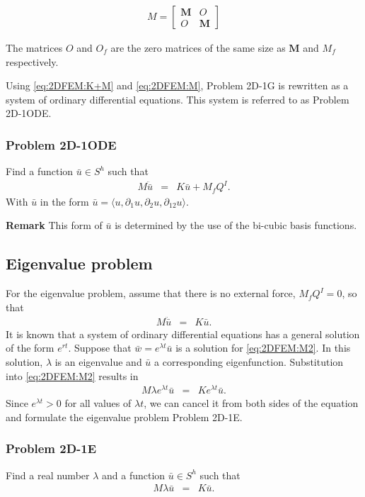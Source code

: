 \documentclass[../../main.tex]{subfiles}
\begin{document}
\begin{eqnarray}
	M = 
	\begin{bmatrix}
		\mathbf{M} & O \\
		O & \mathbf{M}
	\end{bmatrix}\label{eq:2DFEM:M}
\end{eqnarray}

The matrices ${O}$ and ${O_f}$ are the zero matrices of the same size as $\mathbf{M}$ and ${M_f}$ respectively.

Using \eqref{eq:2DFEM:K+M} and \eqref{eq:2DFEM:M}, Problem 2D-1G is rewritten as a system of ordinary differential equations. This system is referred to as Problem 2D-1ODE.

\subsubsection{Problem 2D-1ODE}
Find a function $\bar{u} \in S^h$ such that
\begin{eqnarray}
	M\ddot{\bar{u}} & = & K\bar{u} + M_{f}Q^I.
\end{eqnarray} With $\bar{u}$ in the form $\bar{u} = \langle u, \partial_1 u, \partial_2 u, \partial_{12} u \rangle$.

\textbf{Remark} This form of $\bar{u}$ is determined by the use of the bi-cubic basis functions.

\subsection{Eigenvalue problem}\label{2dFEM_EP}
For the eigenvalue problem, assume that there is no external force, $M_{f}Q^I = 0$, so that 
\begin{eqnarray}
		M\ddot{\bar{u}} & = & K\bar{u}.\label{eq:2DFEM:M2}
\end{eqnarray}
It is known that a system of ordinary differential equations has a general solution of the form $e^{rt}$. Suppose that $\bar{w} = e^{\lambda t} \bar{u}$ is a solution for \eqref{eq:2DFEM:M2}. In this solution, $\lambda$ is an eigenvalue and $\bar{u}$ a corresponding eigenfunction. Substitution into \eqref{eq:2DFEM:M2} results in
\begin{eqnarray*}
	M\lambda e^{\lambda t}\bar{u} & = & Ke^{\lambda t}\bar{u}.
\end{eqnarray*}
Since $e^{\lambda t} > 0$ for all values of $\lambda t$, we can cancel it from both sides of the equation and formulate the eigenvalue problem Problem 2D-1E.

\subsubsection{Problem 2D-1E}
Find a real number $\lambda$ and a function $\bar{u} \in S^h$ such that
\begin{eqnarray}
	M\lambda{\bar{u}} & = & K\bar{u}.
\end{eqnarray}
\end{document}
